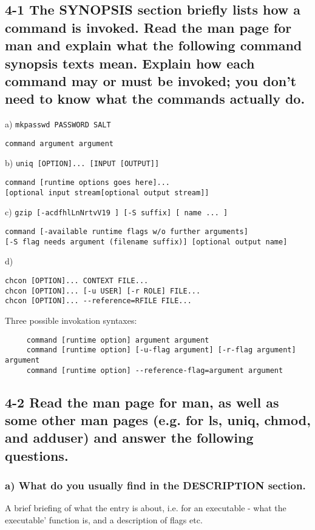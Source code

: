 \subsection{4-1 The SYNOPSIS section briefly lists how a command is invoked. Read the man page for man and explain what the following command synopsis texts mean. Explain how each command may or must be invoked; you don't need to know what the commands actually do.}
a) \verb=mkpasswd PASSWORD SALT=
\begin{verbatim}command argument argument\end{verbatim}

b) \verb=uniq [OPTION]... [INPUT [OUTPUT]]=

\begin{verbatim}command [runtime options goes here]...
[optional input stream[optional output stream]]\end{verbatim}


c) \verb=gzip [-acdfhlLnNrtvV19 ] [-S suffix] [ name ... ]=

\begin{verbatim}
command [-available runtime flags w/o further arguments]
[-S flag needs argument (filename suffix)] [optional output name]
\end{verbatim}

d)

\begin{verbatim}chcon [OPTION]... CONTEXT FILE...
chcon [OPTION]... [-u USER] [-r ROLE] FILE...
chcon [OPTION]... --reference=RFILE FILE...\end{verbatim}

Three possible invokation syntaxes:
\begin{verbatim}
     command [runtime option] argument argument
     command [runtime option] [-u-flag argument] [-r-flag argument] argument
     command [runtime option] --reference-flag=argument argument
\end{verbatim}


\subsection{4-2 Read the man page for man, as well as some other man pages (e.g. for ls, uniq, chmod, and adduser) and answer the following questions.}
\subsubsection{a) What do you usually find in the DESCRIPTION section.}
A brief briefing of what the entry is about, i.e. for an executable - what the executable' function is, and a description of flags etc.

